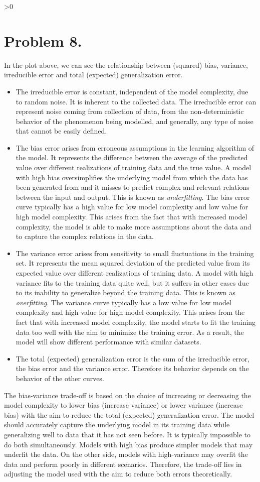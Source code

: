 \documentclass{article}
\newcommand{\hmwkNumber}{8}
\newcommand{\enterProblemHeader}[1]{
    \nobreak{}
}
\newcommand{\exitProblemHeader}[1]{
    \stepcounter{#1}
}
\newcounter{partCounter}
\newcounter{homeworkProblemCounter}
\newenvironment{homeworkProblem}[1][-1]{
    \ifnum#1>0
        \setcounter{homeworkProblemCounter}{\hmwkNumber.#1}
    \fi
    \section{Problem \hmwkNumber.\arabic{homeworkProblemCounter}}
    \setcounter{partCounter}{1}
    \enterProblemHeader{homeworkProblemCounter}
}{
    \exitProblemHeader{homeworkProblemCounter}
}
\begin{document}
\begin{homeworkProblem}
In the plot above, we can see the relationship between (squared) bias, variance, irreducible error and total (expected) generalization error.
\begin{itemize}
    \item The irreducible error is constant, independent of the model complexity, due to random noise. It is inherent to the collected data. The irreducible error can represent noise coming from collection of data, from the non-deterministic behavior of the phenomenon being modelled, and generally, any type of noise that cannot be easily defined.
    \item The bias error arises from erroneous assumptions in the learning algorithm of the model. It represents the difference between the average of the predicted value over different realizations of training data and the true value. A model with high bias oversimplifies the underlying model from which the data has been generated from and it misses to predict complex and relevant relations between the input and output. This is known as \textit{underfitting}. The bias error curve typically has a high value for low model complexity and low value for high model complexity. This arises from the fact that with increased model complexity, the model is able to make more assumptions about the data and to capture the complex relations in the data.
    \item The variance error arises from sensitivity to small fluctuations in the training set. It represents the mean squared deviation of the predicted value from its expected value over different realizations of training data. A model with high variance fits to the training data quite well, but it suffers in other cases due to its inability to generalize beyond the training data. This is known as \textit{overfitting}. The variance curve typically has a low value for low model complexity and high value for high model complexity. This arises from the fact that with increased model complexity, the model starts to fit the training data too well with the aim to minimize the training error. As a result, the model will show different performance with similar datasets.
    \item The total (expected) generalization error is the sum of the irreducible error, the bias error and the variance error. Therefore its behavior depends on the behavior of the other curves.
\end{itemize}

The bias-variance trade-off is based on the choice of increasing or decreasing the model complexity to lower bias (increase variance) or lower variance (increase bias) with the aim to reduce the total (expected) generalization error. The model should accurately capture the underlying model in its training data while generalizing well to data that it has not seen before. It is typically impossible to do both simultaneously. Models with high bias produce simpler models that may underfit the data. On the other side, models with high-variance may overfit the data and perform poorly in different scenarios. Therefore, the trade-off lies in adjusting the model used with the aim to reduce both errors theoretically.
\end{homeworkProblem}
\end{document}
